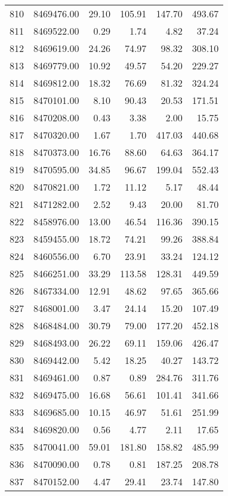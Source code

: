 \begin{table}[ht]
\begin{tabular}{rrrrrr}
  810 & 8469476.00 & 29.10 & 105.91 & 147.70 & 493.67 \\ 
  811 & 8469522.00 & 0.29 & 1.74 & 4.82 & 37.24 \\ 
  812 & 8469619.00 & 24.26 & 74.97 & 98.32 & 308.10 \\ 
  813 & 8469779.00 & 10.92 & 49.57 & 54.20 & 229.27 \\ 
  814 & 8469812.00 & 18.32 & 76.69 & 81.32 & 324.24 \\ 
  815 & 8470101.00 & 8.10 & 90.43 & 20.53 & 171.51 \\ 
  816 & 8470208.00 & 0.43 & 3.38 & 2.00 & 15.75 \\ 
  817 & 8470320.00 & 1.67 & 1.70 & 417.03 & 440.68 \\ 
  818 & 8470373.00 & 16.76 & 88.60 & 64.63 & 364.17 \\ 
  819 & 8470595.00 & 34.85 & 96.67 & 199.04 & 552.43 \\ 
  820 & 8470821.00 & 1.72 & 11.12 & 5.17 & 48.44 \\ 
  821 & 8471282.00 & 2.52 & 9.43 & 20.00 & 81.70 \\ 
  822 & 8458976.00 & 13.00 & 46.54 & 116.36 & 390.15 \\ 
  823 & 8459455.00 & 18.72 & 74.21 & 99.26 & 388.84 \\ 
  824 & 8460556.00 & 6.70 & 23.91 & 33.24 & 124.12 \\ 
  825 & 8466251.00 & 33.29 & 113.58 & 128.31 & 449.59 \\ 
  826 & 8467334.00 & 12.91 & 48.62 & 97.65 & 365.66 \\ 
  827 & 8468001.00 & 3.47 & 24.14 & 15.20 & 107.49 \\ 
  828 & 8468484.00 & 30.79 & 79.00 & 177.20 & 452.18 \\ 
  829 & 8468493.00 & 26.22 & 69.11 & 159.06 & 426.47 \\ 
  830 & 8469442.00 & 5.42 & 18.25 & 40.27 & 143.72 \\ 
  831 & 8469461.00 & 0.87 & 0.89 & 284.76 & 311.76 \\ 
  832 & 8469475.00 & 16.68 & 56.61 & 101.41 & 341.66 \\ 
  833 & 8469685.00 & 10.15 & 46.97 & 51.61 & 251.99 \\ 
  834 & 8469820.00 & 0.56 & 4.77 & 2.11 & 17.65 \\ 
  835 & 8470041.00 & 59.01 & 181.80 & 158.82 & 485.99 \\ 
  836 & 8470090.00 & 0.78 & 0.81 & 187.25 & 208.78 \\ 
  837 & 8470152.00 & 4.47 & 29.41 & 23.74 & 147.80 \\ 

\end{tabular}
\end{table}
